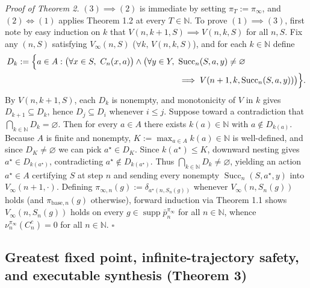 \documentclass[11pt,a4paper]{article}
\newcounter{none}
\begin{document}
\emph{Proof of Theorem 2.} \((3) \implies (2)\) is immediate by setting
\(\pi_T := \pi_\infty\), and \((2) \iff (1)\) applies Theorem 1.2 at
every \(T \in \mathbb{N}\). To prove \((1) \implies (3)\), first note by
easy induction on \(k\) that \(V(n, k+1, S) \implies V(n, k, S)\) for
all \(n, S\). Fix any \((n, S)\) satisfying \(V_\infty(n, S)\)
(\(\forall k,\, V(n, k, S)\)), and for each \(k \in \mathbb{N}\) define
\[\begin{aligned}
D_k := \Bigl\{a \in A : \bigl(\forall x \in S,\ C_n(x,a)\bigr) \land \bigl(\forall y \in Y,\ &\operatorname{Succ}_n(S,a,y) \neq \varnothing \\
&\implies V(n+1, k, \operatorname{Succ}_n(S,a,y))\bigr)\Bigr\}.
\end{aligned}\] By \(V(n, k+1, S)\), each \(D_k\) is nonempty, and
monotonicity of \(V\) in \(k\) gives \(D_{k+1} \subseteq D_k\), hence
\(D_j \subseteq D_i\) whenever \(i \le j\). Suppose toward a
contradiction that \(\bigcap_{k \in \mathbb{N}} D_k = \varnothing\).
Then for every \(a \in A\) there exists \(k(a) \in \mathbb{N}\) with
\(a \notin D_{k(a)}\). Because \(A\) is finite and nonempty,
\(K := \max_{a \in A} k(a) \in \mathbb{N}\) is well-defined, and since
\(D_K \neq \varnothing\) we can pick \(a^\star \in D_K\). Since
\(k(a^\star) \le K\), downward nesting gives
\(a^\star \in D_{k(a^\star)}\), contradicting
\(a^\star \notin D_{k(a^\star)}\). Thus
\(\bigcap_{k \in \mathbb{N}} D_k \neq \varnothing\), yielding an action
\(a^\star \in A\) certifying \(S\) at step \(n\) and sending every
nonempty \(\operatorname{Succ}_n(S, a^\star, y)\) into
\(V_\infty(n+1, \cdot)\). Defining
\(\pi_{\infty, n}(g) := \delta_{a^\star(n, S_n(g))}\) whenever
\(V_\infty(n, S_n(g))\) holds (and \(\pi_{\mathrm{base}, n}(g)\)
otherwise), forward induction via Theorem 1.1 shows
\(V_\infty(n, S_n(g))\) holds on every
\(g \in \operatorname{supp}\bar{p}_n^{\pi_\infty}\) for all
\(n \in \mathbb{N}\), whence \(\nu_n^{\pi_\infty}(C_n^c) = 0\) for all
\(n \in \mathbb{N}\). \(\square\)

\subsection{Greatest fixed point, infinite-trajectory safety, and
executable synthesis (Theorem
3)}\label{greatest-fixed-point-infinite-trajectory-safety-and-executable-synthesis-theorem-3}
\end{document}
